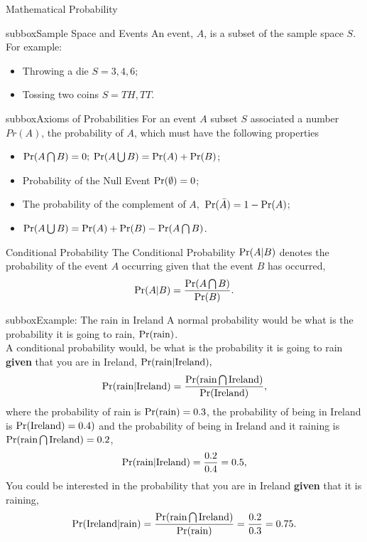 \documentclass[10pt,a4paper]{article}
\def\Pr{\mathop{\rm Pr}}
\begin{document}
\begin{multicols}{3}
\begin{textbox}{Mathematical Probability }
\begin{subbox}{subbox}{Sample Space and Events}
An event, $A$, is a subset of the sample space $S$. For example:
\begin{itemize}
    \item Throwing a die $S={3,4,6};$
    \item Tossing two coins $S={TH,TT}.$
\end{itemize}
\end{subbox}

\begin{subbox}{subbox}{Axioms of Probabilities}
\tiny
For an event $A$ subset $S$ associated a number $Pr(A)$, the probability of $A$, which must have the following properties

\begin{itemize}
     \item $\Pr(A \bigcap B)=0;$ $\Pr(A\bigcup B)= \Pr(A)+\Pr(B) $;
     \item Probability of the Null Event $\Pr(\emptyset)=0$;
     \item The probability of the complement of $A,$ $\Pr(\bar{A})=1-\Pr(A)$;
     \item $\Pr(A \bigcup B)= \Pr(A)+\Pr(B)-\Pr(A\bigcap B)$.
\end{itemize}
\end{subbox}


\end{textbox}


\begin{textbox}{Conditional Probability}
 The Conditional Probability $\Pr(A|B)$ denotes the probability of the event $A$ occurring given that the event $B$ has occurred,
\[ \Pr(A|B)=\frac{\Pr(A\bigcap B)}{\Pr(B)}.\]
\begin{subbox}{subbox}{Example: The rain in Ireland}
\tiny
A normal probability would be what is the probability it is going to rain, $\Pr(\text{rain})$.\\
A conditional probability would, be what is the probability it is going to rain \textbf{given} that you are in Ireland, $\Pr(\text{rain}|\text{Ireland}),$
\[ \Pr(\text{rain}|\text{Ireland})=\frac{\Pr(\text{rain}\bigcap \text{Ireland})}{\Pr(\text{Ireland})},\]
where the probability of rain is $\Pr(\text{rain})=0.3$, the probability of being in Ireland is $\Pr(\text{Ireland})=0.4)$ and the probability of being in Ireland and it raining is $\Pr(\text{rain}\bigcap \text{Ireland})=0.2$,
\[ \Pr(\text{rain}|\text{Ireland})=\frac{0.2}{0.4}=0.5,\]
You could be interested in the probability that you are in Ireland \textbf{given} that it is raining, 
\[ \Pr(\text{Ireland}|\text{rain})=\frac{\Pr(\text{rain}\bigcap \text{Ireland})}{\Pr(\text{rain})}=\frac{0.2}{0.3}=0.75.\]
\end{subbox}
\end{textbox}


\end{multicols}
\end{document}
